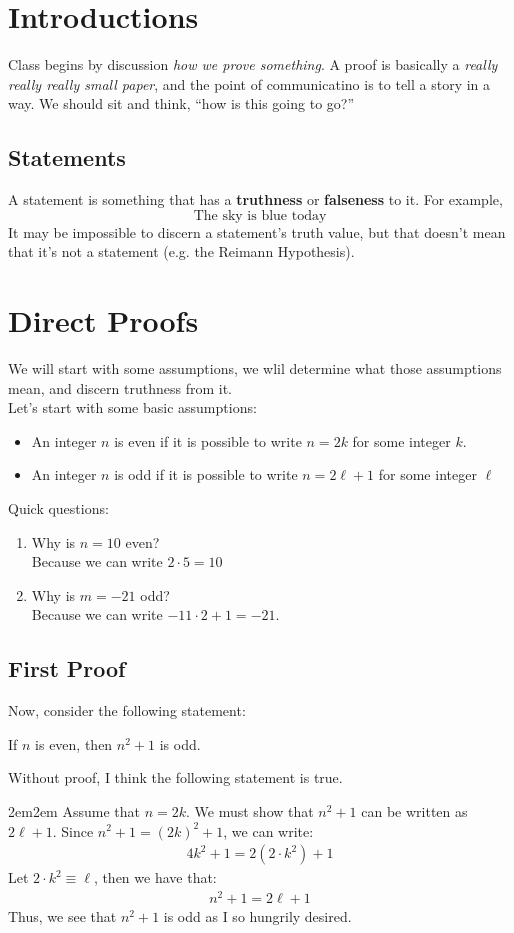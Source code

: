 \documentclass[10pt,oneside]{book}
\newcommand{\en}{\vspace{0.25cm}\\}
\newcommand{\centerit}[1]{{\begin{center} #1 \end{center}}}
\let\endoldproof\endproof
\renewenvironment{proof}[1][\proofname]
  {\vspace{0.2cm}\begin{adjustwidth}{2em}{2em}
   \oldproof[#1]}
  {\endoldproof
   \end{adjustwidth}}
\begin{document}
\section{Introductions}
Class begins by discussion \textit{how we prove something}. A proof is basically a \textit{really really really small paper}, and the point of communicatino is to tell a story in a way. We should sit and think, ``how is this going to go?''
\subsection{Statements}
A statement is something that has a \textbf{truthness} or \textbf{falseness} to it. For example, 
\[\text{The sky is blue today}\]
It may be impossible to discern a statement's truth value, but that doesn't mean that it's not a statement (e.g. the Reimann Hypothesis). 
\section{Direct Proofs}
We will start with some assumptions, we wlil determine what those assumptions mean, and discern truthness from it.\en
Let's start with some basic assumptions:
\begin{itemize}
    \item An integer $n$ is even if it is possible to write $n=2k$ for some integer $k$.
    \item An integer $n$ is odd if it is possible to write $n = 2\ell + 1$ for some integer $\ell$
\end{itemize}
Quick questions:
\begin{enumerate}
    \item Why is $n= 10$ even? \en
    Because we can write $2\cdot 5 = 10$
    \item Why is $m = -21$ odd? \en
    Because we can write $-11\cdot 2 + 1 = -21$. 
\end{enumerate}
\subsection{First Proof}
Now, consider the following statement:
\centerit{If $n$ is even, then $n^2+1$ is odd.}
Without proof, I think the following statement is true.
\begin{proof}
Assume that $n=2k$. We must show that $n^2 +1$ can be written as $2\ell + 1$. Since $n^2 + 1 = (2k)^2 + 1$, we can write:
\begin{align*}
    4k^2 +1 = 2(2\cdot k^2) + 1
\end{align*}
Let $2\cdot k^2 \equiv \ell$, then we have that:
\begin{align*}
    n^2+1 = 2\ell + 1
\end{align*}
Thus, we see that $n^2+1$ is odd as I so hungrily desired.
\end{proof}
\pagebreak
\end{document}
